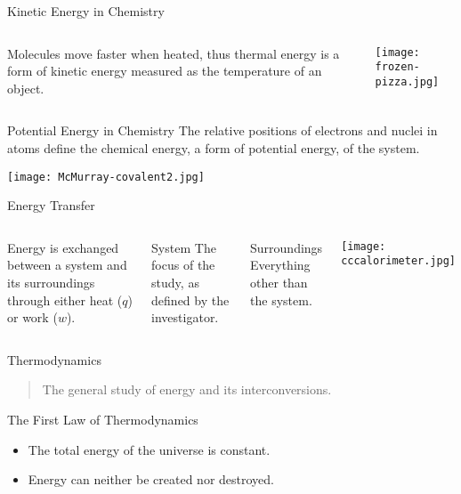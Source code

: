 \documentclass[handout]{beamer}
\begin{document}
\begin{frame}{Kinetic Energy in Chemistry}
	\begin{columns}
		Molecules move faster when heated, thus \alert{thermal energy} is a form
		of kinetic energy measured as the \alert{temperature} of an object.
		\begin{center}
			\texttt{[image: frozen-pizza.jpg]}
		\end{center}
	\end{columns}
\end{frame}

\begin{frame}{Potential Energy in Chemistry}
	The relative positions of electrons and nuclei in atoms define the
	\alert{chemical energy}, a form of potential energy, of the system.
	\begin{center}
		\texttt{[image: McMurray-covalent2.jpg]}
	\end{center}
\end{frame}
	
\begin{frame}{Energy Transfer}
	\begin{columns}
		\column{0.525\textwidth}
		Energy is \alert{exchanged} between a system and its surroundings through
		either \alert{heat} ($q$) or \alert{work} ($w$).

		\begin{block}{System}
			The focus of the study, as defined by the investigator.
		\end{block}

		\begin{block}{Surroundings}
			Everything other than the system.
		\end{block}
	
		\column{0.475\textwidth}
		\begin{center}
			\texttt{[image: cccalorimeter.jpg]}
		\end{center}
	\end{columns}
\end{frame}

\begin{frame}{Thermodynamics}
	\begin{quote}
		The general study of energy and its interconversions.
	\end{quote}

	\bigskip

	\begin{block}{The First Law of Thermodynamics}
		\begin{itemize}
			\item The total energy of the universe is constant.
			\item Energy can neither be created nor destroyed.
		\end{itemize}
	\end{block}
\end{frame}
\end{document}
